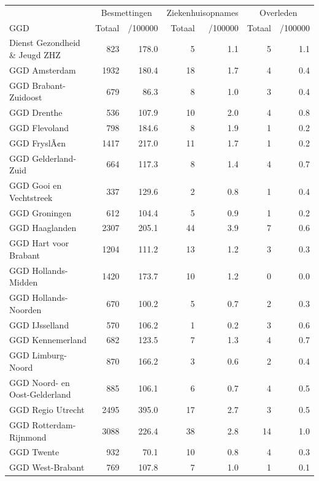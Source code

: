 \documentclass[
  english,
  man,floatsintext]{apa6}
\begin{document}
\begin{table}
\centering\begingroup\fontsize{10}{12}\selectfont

\begin{threeparttable}
\begin{tabular}{lrrrrrr}
\toprule
\multicolumn{1}{c}{ } & \multicolumn{2}{c}{Besmettingen} & \multicolumn{2}{c}{Ziekenhuisopnames} & \multicolumn{2}{c}{Overleden} \\
\cmidrule(l{3pt}r{3pt}){2-3} \cmidrule(l{3pt}r{3pt}){4-5} \cmidrule(l{3pt}r{3pt}){6-7}
GGD & Totaal & /100000 & Totaal & /100000 & Totaal & /100000\\
\midrule
Dienst Gezondheid \& Jeugd ZHZ & 823 & 178.0 & 5 & 1.1 & 5 & 1.1\\
GGD Amsterdam & 1932 & 180.4 & 18 & 1.7 & 4 & 0.4\\
GGD Brabant-Zuidoost & 679 & 86.3 & 8 & 1.0 & 3 & 0.4\\
GGD Drenthe & 536 & 107.9 & 10 & 2.0 & 4 & 0.8\\
GGD Flevoland & 798 & 184.6 & 8 & 1.9 & 1 & 0.2\\
GGD FryslÃ¢n & 1417 & 217.0 & 11 & 1.7 & 1 & 0.2\\
GGD Gelderland-Zuid & 664 & 117.3 & 8 & 1.4 & 4 & 0.7\\
GGD Gooi en Vechtstreek & 337 & 129.6 & 2 & 0.8 & 1 & 0.4\\
GGD Groningen & 612 & 104.4 & 5 & 0.9 & 1 & 0.2\\
GGD Haaglanden & 2307 & 205.1 & 44 & 3.9 & 7 & 0.6\\
GGD Hart voor Brabant & 1204 & 111.2 & 13 & 1.2 & 3 & 0.3\\
GGD Hollands-Midden & 1420 & 173.7 & 10 & 1.2 & 0 & 0.0\\
GGD Hollands-Noorden & 670 & 100.2 & 5 & 0.7 & 2 & 0.3\\
GGD IJsselland & 570 & 106.2 & 1 & 0.2 & 3 & 0.6\\
GGD Kennemerland & 682 & 123.5 & 7 & 1.3 & 4 & 0.7\\
GGD Limburg-Noord & 870 & 166.2 & 3 & 0.6 & 2 & 0.4\\
GGD Noord- en Oost-Gelderland & 885 & 106.1 & 6 & 0.7 & 4 & 0.5\\
GGD Regio Utrecht & 2495 & 395.0 & 17 & 2.7 & 3 & 0.5\\
GGD Rotterdam-Rijnmond & 3088 & 226.4 & 38 & 2.8 & 14 & 1.0\\
GGD Twente & 932 & 70.1 & 10 & 0.8 & 4 & 0.3\\
GGD West-Brabant & 769 & 107.8 & 7 & 1.0 & 1 & 0.1\\

\end{tabular}
\end{threeparttable}
\end{table}
\end{document}
